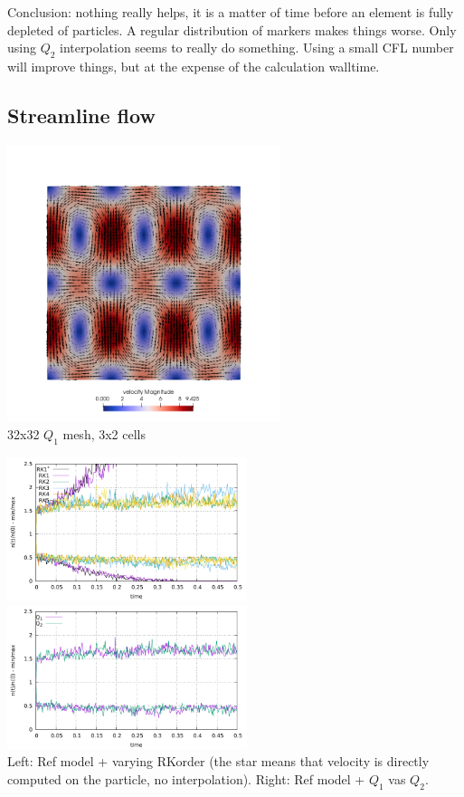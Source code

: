 Conclusion: nothing really helps, it is a matter of time before an element is fully depleted of particles. 
A regular distribution of markers makes things worse. Only using $Q_2$ interpolation seems to really do 
something. Using a small CFL number will improve things, but at the expense of the calculation walltime. 

\newpage
\subsection*{Streamline flow}


\begin{center}
\includegraphics[width=8cm]{python_codes/fieldstone_30/results_streamline/vel}\\
{\captionfont 32x32 $Q_1$ mesh, 3x2 cells}
\end{center}


\begin{center}
\includegraphics[width=7cm]{python_codes/fieldstone_30/results_streamline/markercount_rk12345}
\includegraphics[width=7cm]{python_codes/fieldstone_30/results_streamline/markercount_q12}\\
{\captionfont Left: Ref model + varying RKorder (the star means that velocity 
is directly computed on the particle, no interpolation). Right: Ref model + $Q_1$ vas $Q_2$. }
\end{center}


